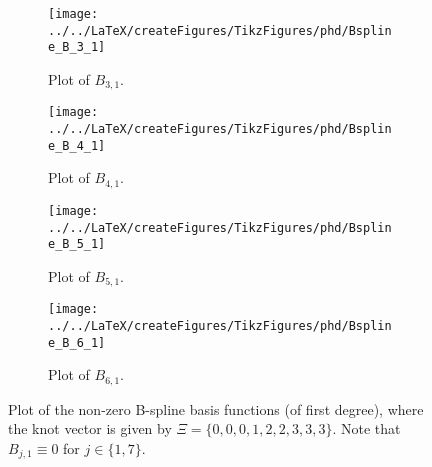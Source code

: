 \begin{figure}
\begin{subfigure}{0.33\textwidth}
			\texttt{[image: ../../LaTeX/createFigures/TikzFigures/phd/Bspline\_B\_3\_1]}
            \caption{Plot of $B_{3,1}$.}
        \end{subfigure}%
        \hspace*{0.005\textwidth}%
        \begin{subfigure}{0.33\textwidth}
       		\centering
			\texttt{[image: ../../LaTeX/createFigures/TikzFigures/phd/Bspline\_B\_4\_1]}
            \caption{Plot of $B_{4,1}$.}
        \end{subfigure}
		\par\bigskip	
		\par\bigskip	
        \begin{subfigure}{0.33\textwidth}
       		\centering
			\texttt{[image: ../../LaTeX/createFigures/TikzFigures/phd/Bspline\_B\_5\_1]}
            \caption{Plot of $B_{5,1}$.}
        \end{subfigure}%
        \hspace*{0.005\textwidth}%
        \begin{subfigure}{0.33\textwidth}
       		\centering
			\texttt{[image: ../../LaTeX/createFigures/TikzFigures/phd/Bspline\_B\_6\_1]}
            \caption{Plot of $B_{6,1}$.}
        \end{subfigure}
        \caption[Plot of B-splines with $\check{p}=1$]{Plot of the non-zero B-spline basis functions (of first degree), where the knot vector is given by $\Xi = \{0, 0, 0, 1, 2, 2, 3, 3, 3\}$. Note that $B_{j,1}\equiv 0$ for $j\in\{1,7\}$.}		
        \label{Fig:Bsplines_p1} 
\end{figure}
